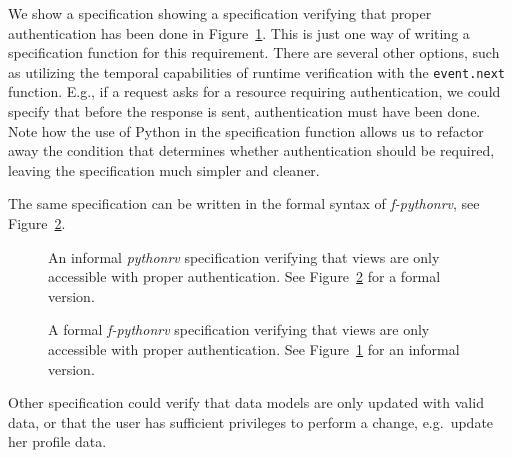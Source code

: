 We show a specification showing a specification verifying that proper
authentication has been done in
Figure~\ref{figure-app-authentication-informal}. This is just one way of
writing a specification function for this requirement. There are several other
options, such as utilizing the temporal capabilities of runtime verification
with the \texttt{event.next} function. E.g., if a request asks for a resource
requiring authentication, we could specify that before the response is sent,
authentication must have been done. Note how the use of Python in the
specification function allows us to refactor away the condition that determines
whether authentication should be required, leaving the specification much
simpler and cleaner.

The same specification can be written in the formal syntax of
\textit{f-pythonrv}, see Figure~\ref{figure-app-authentication-formal}.

\begin{figure}[h!]
	\begin{center}
	\begin{minipage}{0.9\textwidth}
	
	\end{minipage}
	\end{center}

  \caption{An informal \textit{pythonrv} specification verifying that views are
    only accessible with proper authentication. See
    Figure~\ref{figure-app-authentication-formal} for a formal version.}
	\label{figure-app-authentication-informal}
\end{figure}

\begin{figure}[h!]
	\begin{center}
	\begin{minipage}{0.9\textwidth}
	
	\end{minipage}
	\end{center}

  \caption{A formal \textit{f-pythonrv} specification verifying that views are
    only accessible with proper authentication. See
    Figure~\ref{figure-app-authentication-informal} for an informal version.}
	\label{figure-app-authentication-formal}
\end{figure}

Other specification could verify that data models are only updated with valid
data, or that the user has sufficient privileges to perform a change, e.g.\
update her profile data.

